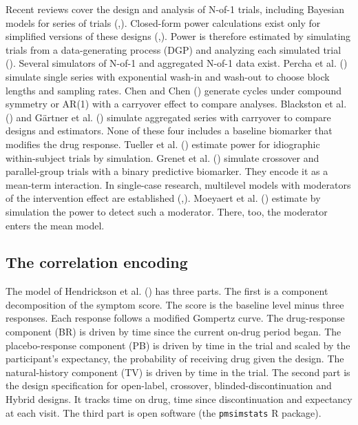 \documentclass[
  11pt,
]{article}
\begin{document}
Recent reviews cover the design and analysis of N-of-1 trials,
including Bayesian models for series of trials
(,). Closed-form power
calculations exist only for simplified versions of these designs
(,). Power is therefore estimated by
simulating trials from a data-generating process (DGP) and analyzing
each simulated trial (). Several simulators of
N-of-1 and aggregated N-of-1 data exist. Percha et al. ()
simulate single series with exponential wash-in and wash-out to choose
block lengths and sampling rates. Chen and Chen () generate
cycles under compound symmetry or AR(1) with a carryover effect to
compare analyses. Blackston et al. () and Gärtner et al.
() simulate aggregated series with carryover to compare
designs and estimators. None of these four includes a baseline
biomarker that modifies the drug response. Tueller et al.
() estimate power for idiographic within-subject trials by
simulation. Grenet et al. () simulate
crossover and parallel-group trials with a binary predictive biomarker.
They encode it as a mean-term interaction. In single-case research,
multilevel models with moderators of the intervention effect are
established (,). Moeyaert et al.
() estimate by simulation the power to detect such a
moderator. There, too, the moderator enters the mean model.

\subsection{The correlation encoding}\label{the-correlation-encoding}

The model of Hendrickson et al. () has three parts.
The first is a component
decomposition of the symptom score. The score is the baseline level
minus three responses. Each response follows a modified Gompertz
curve. The drug-response component (BR) is driven by time since the
current on-drug period began. The placebo-response component (PB) is
driven by time in the trial and scaled by the participant's
expectancy, the probability of receiving drug given the design. The
natural-history component (TV) is driven by time in the trial. The
second part is the design specification for open-label, crossover,
blinded-discontinuation and Hybrid designs. It tracks time on drug,
time since discontinuation and expectancy at each visit. The third
part is open software (the \texttt{pmsimstats} R package).
\end{document}
